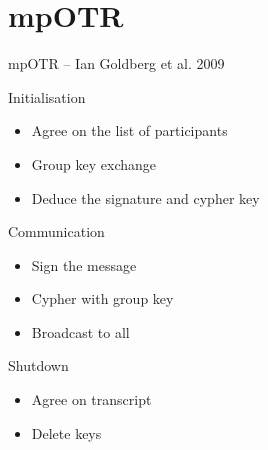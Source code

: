 \documentclass{beamer}
\begin{document}


\section{mpOTR}
\begin{frame}{mpOTR – Ian Goldberg et al. 2009~\cite{mpotr}}
	\begin{block}{Initialisation}
		\begin{itemize}
			\item Agree on the list of participants
			\item Group key exchange
			\item Deduce the signature and cypher key
		\end{itemize}
  \end{block}

	\begin{block}{Communication}
		\begin{itemize}
			\item Sign the message
			\item Cypher with group key
			\item Broadcast to all
		\end{itemize}
  \end{block}

	\begin{block}{Shutdown}
		\begin{itemize}
			\item Agree on transcript
			\item Delete keys
		\end{itemize}
  \end{block}
\end{frame}
\end{document}
